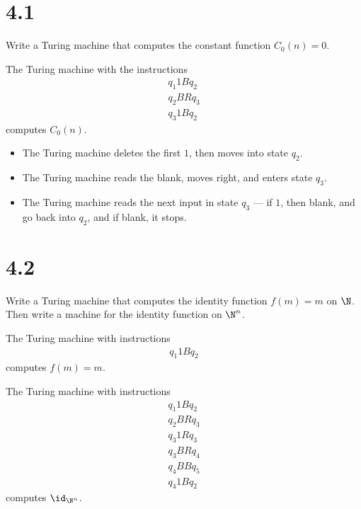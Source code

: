 \documentclass[10pt]{mypackage}
\begin{document}
\RaggedRight
\section{4.1}%
\begin{problem}
  Write a Turing machine that computes the constant function $C_0(n) = 0$.
\end{problem}
\begin{solution}
  The Turing machine with the instructions
  \begin{align*}
    q_1 1 B q_2\\
    q_2 B R q_3\\
    q_3 1 B q_2
  \end{align*}
  computes $C_0(n)$.
  \begin{itemize}
    \item The Turing machine deletes the first $1$, then moves into state $q_2$.
    \item The Turing machine reads the blank, moves right, and enters state $q_3$.
    \item The Turing machine reads the next input in state $q_3$ --- if $1$, then blank, and go back into $q_2$, and if blank, it stops.
  \end{itemize}
\end{solution}
\section{4.2}%
\begin{problem}
  Write a Turing machine that computes the identity function $f(m) = m$ on $\N$. Then write a machine for the identity function on $\N^{n}$.
\end{problem}
\begin{solution}
  The Turing machine with instructions
  \begin{align*}
    q_1 1 B q_2
  \end{align*}
  computes $f(m) = m$.\newline

  The Turing machine with instructions
  \begin{align*}
    q_1 1 B q_2\\
    q_2 B R q_3\\
    q_3 1 R q_3\\
    q_3 B R q_4\\
    q_4 B B q_5\\
    q_4 1 B q_2
  \end{align*}
  computes $\id_{\N^{n}}$.
\end{solution}
\end{document}
